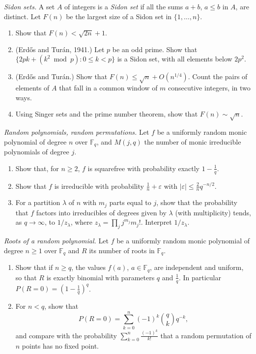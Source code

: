 \begin{exercise}[$\star\star$]\label{pb:sidon}
\emph{Sidon sets.} A set $A$ of integers is a \emph{Sidon set} if all the sums $a+b$, $a\le b$ in $A$, are distinct. Let $F(n)$
be the largest size of a Sidon set in $\{1,\dots,n\}$.
\begin{enumerate}[label=(\alph*)]
\item Show that $F(n)<\sqrt{2n}+1$.
\item (Erdős and Turán, 1941.) Let $p$ be an odd prime. Show that $\{2pk+(k^2\bmod p):0\le k<p\}$ is a Sidon set, with all elements
below $2p^2$.
\item (Erdős and Turán.) Show that $F(n)\le\sqrt n+O(n^{1/4})$. Count the pairs of elements of $A$ that fall in a common window
of $m$ consecutive integers, in two ways.
\item Using Singer sets and the prime number theorem, show that $F(n)\sim\sqrt n$.
\end{enumerate}
\end{exercise}

\begin{exercise}[$\star\star$]\label{pb:randpoly}
\emph{Random polynomials, random permutations.} Let $f$ be a uniformly random monic polynomial of degree $n$ over $\mathbb F_q$,
and $M(j,q)$ the number of monic irreducible polynomials of degree $j$.
\begin{enumerate}[label=(\alph*)]
\item Show that, for $n\ge2$, $f$ is squarefree with probability exactly $1-\frac1q$.
\item Show that $f$ is irreducible with probability $\frac1n+\varepsilon$ with $|\varepsilon|\le\frac2n q^{-n/2}$.
\item For a partition $\lambda$ of $n$ with $m_j$ parts equal to $j$, show that the probability that $f$ factors into irreducibles of
degrees given by $\lambda$ (with multiplicity) tends, as $q\to\infty$, to $1/z_\lambda$, where $z_\lambda=\prod_jj^{m_j}m_j!$.
Interpret $1/z_\lambda$.
\end{enumerate}
\end{exercise}

\begin{exercise}[$\star\star$]\label{pb:noroots}
\emph{Roots of a random polynomial.} Let $f$ be a uniformly random monic polynomial of degree $n\ge1$ over $\mathbb F_q$ and $R$ its
number of roots in $\mathbb F_q$.
\begin{enumerate}[label=(\alph*)]
\item Show that if $n\ge q$, the values $f(a)$, $a\in\mathbb F_q$, are independent and uniform, so that $R$ is exactly binomial
with parameters $q$ and $\frac1q$. In particular $P(R=0)=(1-\frac1q)^q$.
\item For $n<q$, show that
\[
P(R=0)=\sum_{k=0}^n(-1)^k\binom qk q^{-k},
\]
and compare with the probability $\sum_{k=0}^n\frac{(-1)^k}{k!}$ that a random permutation of $n$ points has no fixed point.
\end{enumerate}
\end{exercise}


